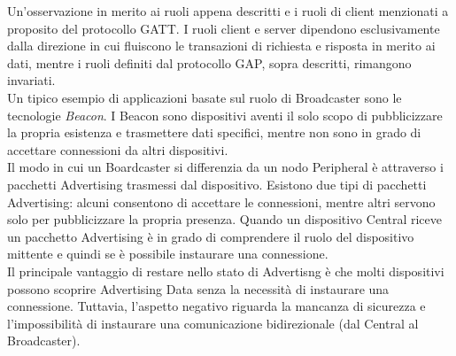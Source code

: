 \noindent Un'osservazione in merito ai ruoli appena descritti e i ruoli di client menzionati a proposito del protocollo GATT. I ruoli client e server dipendono esclusivamente dalla direzione in cui fluiscono le transazioni di richiesta e risposta in merito ai dati, mentre i ruoli definiti dal protocollo GAP, sopra descritti, rimangono invariati.\\

\noindent Un tipico esempio di applicazioni basate sul ruolo di Broadcaster sono le tecnologie \textit{Beacon}. I Beacon sono dispositivi aventi il solo scopo di pubblicizzare la propria esistenza e trasmettere dati specifici, mentre non sono in grado di accettare connessioni da altri dispositivi.\\

\noindent Il modo in cui un Boardcaster si differenzia da un nodo Peripheral è attraverso i pacchetti Advertising trasmessi dal dispositivo. Esistono due tipi di pacchetti Advertising: alcuni consentono di accettare le connessioni, mentre altri servono solo per pubblicizzare la propria presenza. Quando un dispositivo Central riceve un pacchetto Advertising è in grado di comprendere il ruolo del dispositivo mittente e quindi se è possibile instaurare una connessione.\\
Il principale vantaggio di restare nello stato di Advertisng è che molti dispositivi possono scoprire Advertising Data senza la necessità di instaurare una connessione. Tuttavia, l'aspetto negativo riguarda la mancanza di sicurezza e l'impossibilità di instaurare una comunicazione bidirezionale (dal Central al Broadcaster).


